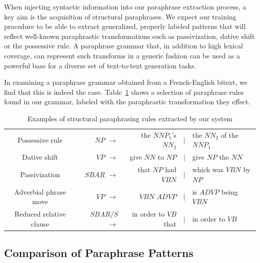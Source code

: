 \documentclass[11pt]{article}
\begin{document}
When injecting syntactic information into our paraphrase extraction
process, a key aim is the acquisition of structural paraphrases. We
expect our training procedure to be able to extract generalized,
properly labeled patterns that will reflect well-known paraphrastic
transformations such as passivization, dative shift or the possessive
rule. A paraphrase grammar that, in addition to high lexical coverage,
can represent such transforms in a generic fashion can be used as a
powerful base for a diverse set of text-to-text generation tasks. 

In examining a paraphrase grammar obtained from a French-English
bitext, we find that this is indeed the
case. Table~\ref{example_rules} shows a selection of paraphrase rules
found in our grammar, labeled with the paraphrastic transformation
they effect. 


\begin{table}
  \begin{center}
  \begin{tabular}{|c|rrcl|}
    \hline
    Possessive rule & $\mathit{NP}$ $\rightarrow$  & the $\mathit{NNP}_1$'s
    $\mathit{NN}_2$ & $\mid$ & the $\mathit{NN}_2$ of the $\mathit{NNP}_1$
    \\

    Dative shift & $\mathit{VP}$ $\rightarrow$ & give $\mathit{NN}$ to
    $\mathit{NP}$ & $\mid$ & give $\mathit{NP}$ the $\mathit{NN}$ \\

    Passivization &
    $\mathit{SBAR}$ $\rightarrow$ & that $\mathit{NP}$ had
    $\mathit{VBN}$ & $\mid$ & which was $\mathit{VBN}$ by $\mathit{NP}$ \\

    Adverbial phrase move & 
    $\mathit{VP}$ $\rightarrow$ & $\mathit{VBN}$ $\mathit{ADVP}$ & $\mid$ & is
    $\mathit{ADVP}$ being $\mathit{VBN}$ \\

    Reduced relative clause & $\mathit{SBAR/S}$ $\rightarrow$ & in order
    to $\mathit{VB}$ that & $\mid$ & in order to $\mathit{VB}$ \\
    \hline
\end{tabular}
\end{center}
\caption{Examples of structural paraphrasing rules extracted by our
  system}
\label{example_rules}
\end{table}

\subsection{Comparison of Paraphrase
  Patterns} \label{pattern_comparison}
\end{document}
